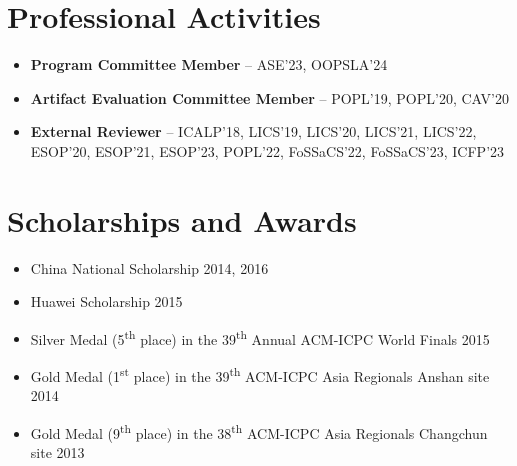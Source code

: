 \documentclass[11pt,letterpaper,roman]{moderncv}        %
\begin{document}
\section{Professional Activities}

\begin{itemize}
  \item \textbf{Program Committee Member} -- ASE'23, OOPSLA'24
  \item \textbf{Artifact Evaluation Committee Member} -- POPL'19, POPL'20, CAV'20
  \item \textbf{External Reviewer} -- ICALP'18, LICS'19, LICS'20, LICS'21, LICS'22, ESOP'20, ESOP'21, ESOP'23, POPL'22, FoSSaCS'22, FoSSaCS'23, ICFP'23
\end{itemize}

%
%
%
%
%
%
%

\section{Scholarships and Awards}

\begin{itemize}
\item China National Scholarship \hfill 2014, 2016
\item Huawei Scholarship \hfill 2015

  \vspace{4pt}

  \item Silver Medal (5\textsuperscript{th} place) in the 39\textsuperscript{th} Annual ACM-ICPC World Finals \hfill 2015
  \item Gold Medal (1\textsuperscript{st} place) in the 39\textsuperscript{th} ACM-ICPC Asia Regionals Anshan site \hfill 2014
  \item Gold Medal (9\textsuperscript{th} place) in the 38\textsuperscript{th} ACM-ICPC Asia Regionals Changchun site \hfill 2013
\end{itemize}
\end{document}
